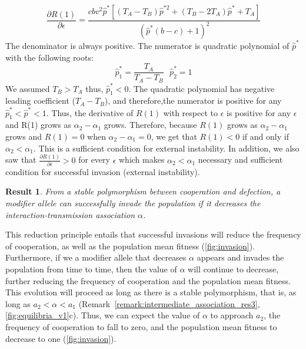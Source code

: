 \documentclass[12pt]{extarticle}
\newtheorem{result}{Result}
\begin{document}
\begin{equation} \label{eq:value_at_1_derivative_simplify}
  \frac{\partial R(1)}{\partial \epsilon} = \frac{c b v^2 \hat{p}^*[(T_A-T_B)\hat{p}^{*2}+(T_B-2T_A)\hat{p}^* + T_A]}{(\hat{p}^*(b-c)+1)^2} 
\end{equation}
The denominator is always positive. The numerator is quadratic polynomial of $\hat{p}^*$ with the following roots:
\begin{equation} \label{eq:numerator_roots}
  \hat{p}^*_1 = \frac{T_A}{T_A-T_B} \,\,\,\, \hat{p}^*_2 = 1
\end{equation}
We assumed $T_B > T_A$ thus, $\hat{p}^*_1<0$. The quadratic polynomial has negative leading coefficient ($T_A-T_B$), and therefore,the numerator is positive for any $\hat{p}^*_1<\hat{p}^*<1$.
Thus, the derivative of $R(1)$ with respect to $\epsilon$ is positive for any $\epsilon$ and R(1) grows as $\alpha_2-\alpha_1$ grows. 
Therefore, because $R(1)$ grows as $\alpha_2-\alpha_1$ grows and $R(1)=0$ when $\alpha_2-\alpha_1=0$, we get that $R(1)<0$ if and only if $\alpha_2<\alpha_1$. This is a sufficient condition  for external instability.
In addition, we also saw that $\frac{\partial R(1)}{\partial \epsilon} > 0$ for every $\epsilon$ which makes $\alpha_2<\alpha_1$ necessary and sufficient condition for successful invasion (external instability).


\begin{result}%
\label{result:evol_social_association}
From a stable polymorphism between cooperation and defection, a modifier allele can successfully invade the population if it decreases the interaction-transmission association $\alpha$.
\end{result}

This reduction principle entails that successful invasions will reduce the frequency of cooperation, as well as the population mean fitness (\autoref{fig:invasion}).
Furthermore, if we a modifier allele that decreases $\alpha$ appears and invades the population from time to time, then the value of $\alpha$ will continue to decrease, further reducing the frequency of cooperation and the population mean fitness.
This evolution will proceed as long as there is a stable polymorphism, that is, as long as $a_2 < \alpha < a_1$ (Remark~\ref{remark:intermediate_association_res3}, \autoref{fig:equilibria_v1}c). 
Thus, we can expect the value of $\alpha$ to approach $a_2$, the frequency of cooperation to fall to zero, and the population mean fitness to decrease to one (\autoref{fig:invasion}).
\end{document}
